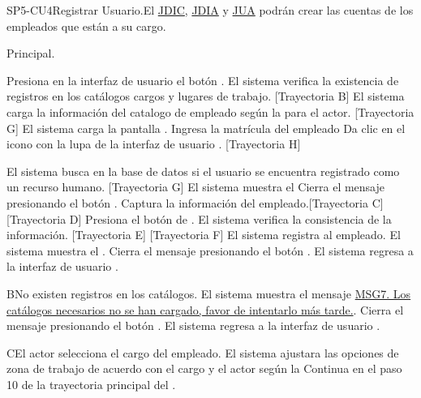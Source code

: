\begin{UseCase}{SP5-CU4}{Registrar Usuario.}{El \hyperlink{JDIC}{JDIC}, \hyperlink{JDIA}{JDIA} y  \hyperlink{JUA}{JUA} podrán crear las cuentas de los empleados que están a su cargo. }
\end{UseCase}

\begin{UCtrayectoria}{Principal.}
    
  \UCpaso[\UCactor] Presiona en la interfaz de usuario  el botón \IUbutton{+}.
    \UCpaso  El sistema verifica la existencia de registros en los catálogos cargos  y  lugares de trabajo. [Trayectoria B] 
    \UCpaso El sistema carga la información del catalogo de empleado  según la  para el actor. [Trayectoria G]
    \UCpaso El sistema carga la pantalla  .
    \UCpaso[\UCactor] Ingresa la matrícula del empleado 
    \UCpaso[\UCactor] Da clic en el icono con la lupa de la interfaz de usuario . [Trayectoria H]
    
    \UCpaso El sistema busca en la base de datos si el usuario se encuentra registrado como un recurso humano. [Trayectoria G]
    \UCpaso El sistema muestra el 
    \UCpaso[\UCactor] Cierra el mensaje presionando el botón .
    \UCpaso[\UCactor]
    Captura la información del empleado.[Trayectoria C] [Trayectoria D] 
    \UCpaso[\UCactor]  Presiona el botón de .
    \UCpaso El sistema verifica la consistencia de la información. [Trayectoria E] [Trayectoria F]
    \UCpaso El sistema registra al empleado.
    \UCpaso  El sistema muestra el .    
    \UCpaso[\UCactor] Cierra el mensaje presionando el botón .
    \UCpaso El sistema regresa a la interfaz de usuario .
\end{UCtrayectoria}


\begin{UCtrayectoriaA}{B}{No existen registros en los catálogos.}
    \UCpaso El sistema muestra el mensaje \hyperref[MSG7]{MSG7. Los catálogos necesarios no se han cargado, favor de intentarlo más tarde.}.
	\UCpaso[\UCactor] Cierra el mensaje presionando el botón .
     \UCpaso El sistema regresa a la interfaz de usuario .
\end{UCtrayectoriaA}

\begin{UCtrayectoriaA}{C}{El actor selecciona el cargo del empleado.}
    \UCpaso     El sistema ajustara las opciones de zona de trabajo de acuerdo con el cargo y el actor según la 
    \UCpaso Continua en el paso 10 de la trayectoria principal del .
\end{UCtrayectoriaA}


